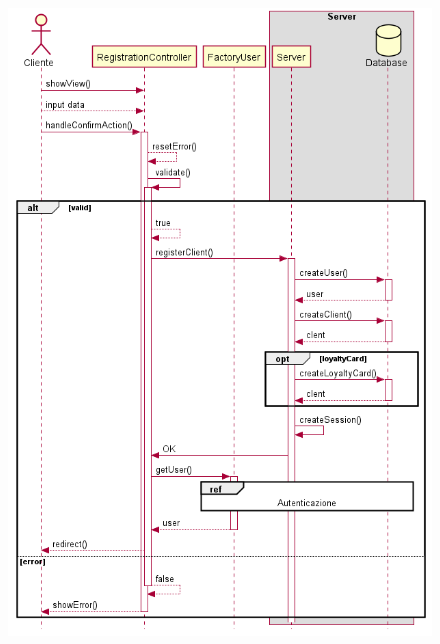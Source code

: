\documentclass[12pt, a4paper]{article}
\begin{document}
\begin{figure}[H]
\centering
\includegraphics[width=\linewidth]{registration_sequence.png}

\end{figure}
\end{document}
